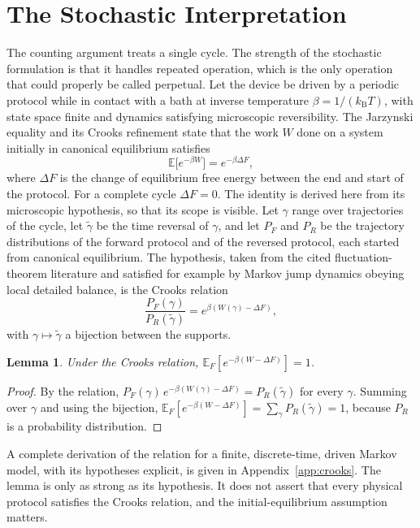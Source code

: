 \documentclass[11pt]{article}
\newtheorem{lemma}{Lemma}
\theoremstyle{definition}
\theoremstyle{remark}
\newcommand{\E}{\mathbb{E}}
\newcommand{\kB}{k_{\mathrm B}}
\begin{document}
\section{The Stochastic Interpretation}

The counting argument treats a single cycle. The strength of the stochastic formulation is that it handles repeated operation, which is the only operation that could properly be called perpetual. Let the device be driven by a periodic protocol while in contact with a bath at inverse temperature $\beta = 1/(\kB T)$, with state space finite and dynamics satisfying microscopic reversibility. The Jarzynski equality \cite{jarzynski1997} and its Crooks refinement \cite{crooks1999} state that the work $W$ done on a system initially in canonical equilibrium satisfies
\[
\E\big[e^{-\beta W}\big] = e^{-\beta \Delta F},
\]
where $\Delta F$ is the change of equilibrium free energy between the end and start of the protocol. For a complete cycle $\Delta F = 0$. The identity is derived here from its microscopic hypothesis, so that its scope is visible. Let $\gamma$ range over trajectories of the cycle, let $\tilde\gamma$ be the time reversal of $\gamma$, and let $P_F$ and $P_R$ be the trajectory distributions of the forward protocol and of the reversed protocol, each started from canonical equilibrium. The hypothesis, taken from the cited fluctuation-theorem literature and satisfied for example by Markov jump dynamics obeying local detailed balance, is the Crooks relation
\[
\frac{P_F(\gamma)}{P_R(\tilde\gamma)} = e^{\beta (W(\gamma) - \Delta F)},
\]
with $\gamma \mapsto \tilde\gamma$ a bijection between the supports.

\begin{lemma}\label{lem:jarzynski}
Under the Crooks relation, $\E_F[e^{-\beta (W - \Delta F)}] = 1$.
\end{lemma}

\begin{proof}
By the relation, $P_F(\gamma)\, e^{-\beta (W(\gamma) - \Delta F)} = P_R(\tilde\gamma)$ for every $\gamma$. Summing over $\gamma$ and using the bijection, $\E_F[e^{-\beta (W - \Delta F)}] = \sum_{\gamma} P_R(\tilde\gamma) = 1$, because $P_R$ is a probability distribution.
\end{proof}

A complete derivation of the relation for a finite, discrete-time, driven Markov model, with its hypotheses explicit, is given in Appendix~\ref{app:crooks}. The lemma is only as strong as its hypothesis. It does not assert that every physical protocol satisfies the Crooks relation, and the initial-equilibrium assumption matters.
\end{document}
